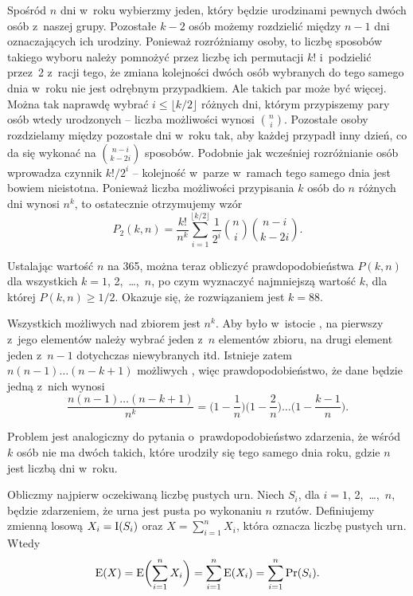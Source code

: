 Spośród $n$ dni w~roku wybierzmy jeden, który będzie urodzinami pewnych dwóch osób z~naszej grupy. Pozostałe $k-2$ osób możemy rozdzielić między $n-1$ dni oznaczających ich urodziny. Ponieważ rozróżniamy osoby, to liczbę sposobów takiego wyboru należy pomnożyć przez liczbę ich permutacji $k!$ i~podzielić przez~2 z~racji tego, że zmiana kolejności dwóch osób wybranych do tego samego dnia w~roku nie jest odrębnym przypadkiem. Ale takich par może być więcej. Można tak naprawdę wybrać $i\le\lfloor k/2\rfloor$ różnych dni, którym przypiszemy pary osób wtedy urodzonych -- liczba możliwości wynosi $\binom{n}{i}$. Pozostałe osoby rozdzielamy między pozostałe dni w~roku tak, aby każdej przypadł inny dzień, co da się wykonać na $\binom{n-i}{k-2i}$ sposobów. Podobnie jak wcześniej rozróżnianie osób wprowadza czynnik $k!/2^i$ -- kolejność w~parze w~ramach tego samego dnia jest bowiem nieistotna. Ponieważ liczba możliwości przypisania $k$ osób do $n$ różnych dni wynosi $n^k$, to ostatecznie otrzymujemy wzór
\[
	P_2(k,n) = \frac{k!}{n^k}\sum_{i=1}^{\lfloor k/2\rfloor}\frac{1}{2^i}\binom{n}{i}\binom{n-i}{k-2i}.
\]

Ustalając wartość $n$ na 365, można teraz obliczyć prawdopodobieństwa $P(k,n)$ dla wszystkich $k=1$, 2,~\dots,~$n$, po czym wyznaczyć najmniejszą wartość $k$, dla której $P(k,n)\ge1/2$. Okazuje się, że rozwiązaniem jest $k=88$.

\exercise %
Wszystkich możliwych  nad zbiorem  jest $n^k$. Aby  było w~istocie , na pierwszy z~jego elementów należy wybrać jeden z~$n$ elementów zbioru, na drugi element jeden z~$n-1$ dotychczas niewybranych itd. Istnieje zatem $n(n-1)\dots(n-k+1)$ możliwych , więc prawdopodobieństwo, że dane  będzie jedną z~nich wynosi
\[
	\frac{n(n-1)\dots(n-k+1)}{n^k} = \biggl(1-\frac{1}{n}\biggr)\biggl(1-\frac{2}{n}\biggr)\dots\biggl(1-\frac{k-1}{n}\biggr).
\]

Problem jest analogiczny do pytania o~prawdopodobieństwo zdarzenia, że wśród $k$ osób nie ma dwóch takich, które urodziły się tego samego dnia roku, gdzie $n$ jest liczbą dni w~roku.

\exercise %
Obliczmy najpierw oczekiwaną liczbę pustych urn. Niech $S_i$, dla $i=1$, 2,~\dots,~$n$, będzie zdarzeniem, że  urna jest pusta po wykonaniu $n$ rzutów. Definiujemy zmienną losową $X_i=\operatorname{I}(S_i)$ oraz $X=\sum_{i=1}^nX_i$, która oznacza liczbę pustych urn. Wtedy
\[
	\operatorname{E}(X) = \operatorname{E}\biggl(\sum_{i=1}^nX_i\biggr) = \sum_{i=1}^n\operatorname{E}(X_i) = \sum_{i=1}^n\Pr(S_i).
\]

